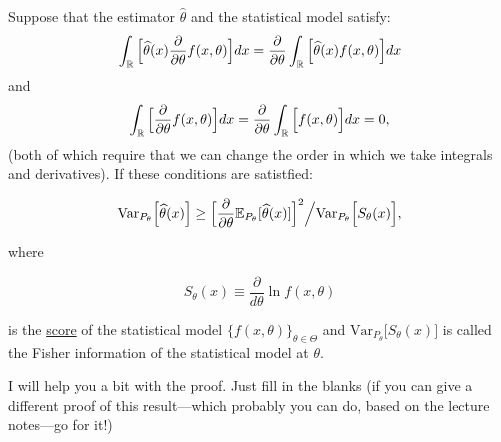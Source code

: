 \documentclass[11pt]{article} %
\begin{document}
\begin{proposition}
Suppose that the estimator $\widehat{\theta}$ and the statistical model satisfy:
\begin{equation} \label{equation:regCR}
\int_{\mathbb{R}}\Big[ \widehat{\theta}(x) \frac{\partial}{\partial \theta}f(x,\theta) \Big] dx =  \frac{\partial}{\partial \theta} \int_{\mathbb{R}}\Big[ \widehat{\theta}(x) f(x,\theta) \Big] dx
\end{equation}
and 
\begin{equation}\label{equation:scoreCR}
\int_{\mathbb{R}} \Big[ \frac{\partial}{\partial \theta}f(x,\theta)  \Big] dx= \frac{\partial}{\partial \theta} \int_{\mathbb{R}} \Big[ f(x,\theta)  \Big] dx=0,
\end{equation}
\noindent (both of which require that we can change the order in which we take integrals and derivatives). If these conditions are satistfied:

$$\text{Var}_{P_\theta}\Big[ \widehat{\theta}(x)\Big] \geq \Big[ \frac{\partial}{\partial \theta} \mathbb{E}_{P_\theta}[\widehat{\theta}(x)] \Big]^2 \Big/ \text{Var}_{P_\theta}\Big[S_{\theta}(x) \Big],$$

\noindent where

$$S_{\theta}(x) \equiv \frac{\partial}{d\theta} \ln f(x,\theta)$$

\noindent is the \underline{score} of the statistical model $\{f(x,\theta)\}_{\theta \in \Theta}$ and $\text{Var}_{P_\theta}\Big[S_{\theta}(x) \Big]$ is called the Fisher information of the statistical model at $\theta$. 


\end{proposition}

\noindent I will help you a bit with the proof. Just fill in the blanks (if you can give a different proof of this result---which probably you can do, based on the lecture notes---go for it!)
\end{document}
